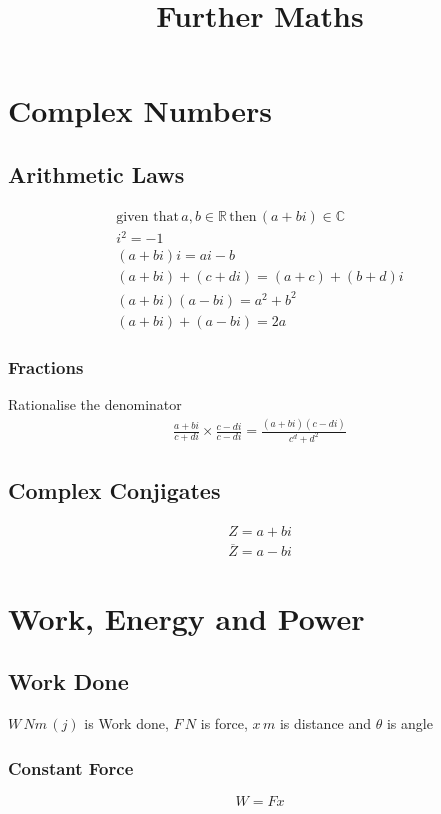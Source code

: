 \documentclass{article}
\begin{document}
\title{Further Maths}
\maketitle

\section{Complex Numbers}

\subsection{Arithmetic Laws}
\begin{gather}
	\text{given that}\, a,b \in \mathbb{R}\, \text{then}\, (a + bi)\in \mathbb{C} \\
	i^2 = -1 \\
	(a+bi)i = ai - b \\
	(a + bi) + (c + di) = (a + c) + (b + d)i \\
	(a + bi)(a - bi) = a^2 + b^2 \\
	(a + bi) + (a - bi) = 2a
\end{gather}

\subsubsection{Fractions}
Rationalise the denominator
\begin{gather}
	\frac{a + bi}{c + di}
	\times \frac{c - di}{c - di}
	= \frac{(a + bi)(c - di)}{c^d + d^2}
\end{gather}

\subsection{Complex Conjigates}
\begin{gather}
	Z = a + b i \\
	\overline{Z} = a - b i
\end{gather}

\section{Work, Energy and Power}
\subsection{Work Done}
$W\,\si{Nm}\,\left (\si{j} \right )$ is Work done, $F\,\si{N}$ is force, $x\,\si{m}$ is distance and $\theta$ is angle
\subsubsection{Constant Force}
\begin{equation}
	W = Fx
\end{equation}
\end{document}
